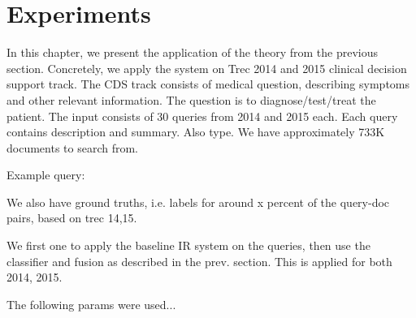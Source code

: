 \chapter{Experiments}

In this chapter, we present the application of the theory from the previous section. Concretely, we apply the system on Trec 2014 and 2015
clinical decision support track. 
The CDS track consists of medical question, describing symptoms and other relevant information. The question is to diagnose/test/treat
the patient.
The input consists of 30 queries from 2014 and 2015 each. Each query contains description and summary. Also type.
We have approximately 733K documents to search from.

Example query:

We also have ground truths, i.e. labels for around x percent of the query-doc pairs, based on trec 14,15. 

We first one to apply the baseline IR system on the queries, then use the classifier and fusion as described in the prev. section.
This is applied for both 2014, 2015.

The following params were used...






